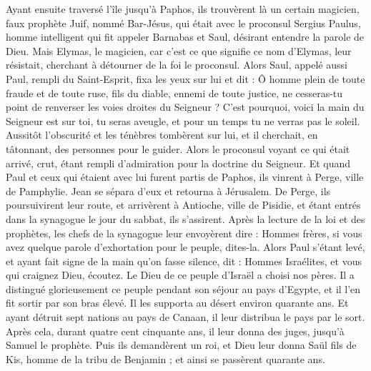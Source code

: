 \begin{multicols}{2}
Ayant ensuite traversé l'île jusqu'à Paphos, ils trouvèrent là un certain magicien, faux prophète Juif, nommé Bar-Jésus,
qui était avec le proconsul Sergius Paulus, homme intelligent qui fit appeler Barnabas et Saul, désirant entendre la parole de Dieu.
Mais Elymas, le magicien, car c'est ce que signifie ce nom d'Elymas, leur résistait, cherchant à détourner de la foi le proconsul.
Alors Saul, appelé aussi Paul, rempli du Saint-Esprit, fixa les yeux sur lui et dit :
Ô homme plein de toute fraude et de toute ruse, fils du diable, ennemi de toute justice, ne cesseras-tu point de renverser les voies droites du Seigneur ?
C'est pourquoi, voici la main du Seigneur est sur toi, tu seras aveugle, et pour un temps tu ne verras pas le soleil. Aussitôt l’obscurité et les ténèbres tombèrent sur lui, et il cherchait, en tâtonnant, des personnes pour le guider.
Alors le proconsul voyant ce qui était arrivé, crut, étant rempli d'admiration pour la doctrine du Seigneur.
Et quand Paul et ceux qui étaient avec lui furent partis de Paphos, ils vinrent à Perge, ville de Pamphylie. Jean se sépara d’eux et retourna à Jérusalem.
De Perge, ils poursuivirent leur route, et arrivèrent à Antioche, ville de Pisidie, et étant entrés dans la synagogue le jour du sabbat, ils s'assirent.
Après la lecture de la loi et des prophètes, les chefs de la synagogue leur envoyèrent dire : Hommes frères, si vous avez quelque parole d'exhortation pour le peuple, dites-la.
Alors Paul s'étant levé, et ayant fait signe de la main qu'on fasse silence, dit : Hommes Israélites, et vous qui craignez Dieu, écoutez.
Le Dieu de ce peuple d'Israël a choisi nos pères. Il a distingué glorieusement ce peuple pendant son séjour au pays d’Egypte, et il l’en fit sortir par son bras élevé.
Il les supporta au désert environ quarante ans.
Et ayant détruit sept nations au pays de Canaan, il leur distribua le pays par le sort.
Après cela, durant quatre cent cinquante ans, il leur donna des juges, jusqu'à Samuel le prophète.
Puis ils demandèrent un roi, et Dieu leur donna Saül fils de Kis, homme de la tribu de Benjamin ; et ainsi se passèrent quarante ans.

\end{multicols}
